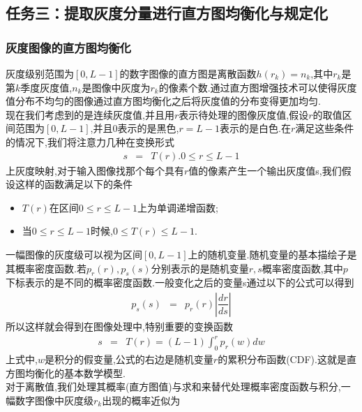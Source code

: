 \documentclass[UTF8,a4paper,10pt]{ctexart}
\begin{document}
\begin{flushleft}
        \subsection{任务三：提取灰度分量进行直方图均衡化与规定化}
        \subsubsection{灰度图像的直方图均衡化}
        \hspace{2em}灰度级别范围为$[0,L-1]$的数字图像的直方图是离散函数$h(r_{k})=n_{k}$,其中$r_{k}$是第$k$季度灰度值,$n_{k}$是图像中灰度为$r_{k}$的像素个数.通过直方图增强技术可以使得灰度值分布不均匀的图像通过直方图均衡化之后将灰度值的分布变得更加均匀.\\
        \hspace{2em}现在我们考虑到的是连续灰度值,并且用$r$表示待处理的图像灰度值,假设$r$的取值区间范围为$[0,L-1]$,并且$0$表示的是黑色,$r=L-1$表示的是白色.在$r$满足这些条件的情况下,我们将注意力几种在变换形式
        \begin{eqnarray}
            s&=&T(r).0\leq{r}\leq{L-1}\nonumber
        \end{eqnarray}
        上灰度映射,对于输入图像找那个每个具有$r$值的像素产生一个输出灰度值s,我们假设这样的函数满足以下的条件
        \begin{itemize}
            \item $T(r)$在区间$0\leq{r}\leq{L-1}$上为单调递增函数;
            \item 当$0\leq{r}\leq{L-1}$时候,$0\leq{T(r)}\leq{L-1}$.
        \end{itemize}
        \hspace{2em}一幅图像的灰度级可以视为区间$[0,L-1]$上的随机变量.随机变量的基本描绘子是其概率密度函数.若$p_{r}(r),p_{s}(s)$分别表示的是随机变量$r,s$概率密度函数,其中$p$下标表示的是不同的概率密度函数.一般变化之后的变量s通过以下的公式可以得到
        \begin{eqnarray}
            p_{s}(s)&=&p_{r}(r)\left|\dfrac{dr}{ds}\right|\nonumber
        \end{eqnarray}
        所以这样就会得到在图像处理中,特别重要的变换函数
        \begin{eqnarray}
            s&=&T(r)=(L-1)\int_{0}^{r}p_{r}(w)dw\nonumber
        \end{eqnarray}
        上式中,$w$是积分的假变量,公式的右边是随机变量$r$的累积分布函数(CDF).这就是直方图均衡化的基本数学模型.\\
        \hspace{2em}对于离散值,我们处理其概率(直方图值)与求和来替代处理概率密度函数与积分,一幅数字图像中灰度级$r_{k}$出现的概率近似为

\end{flushleft}
\end{document}
